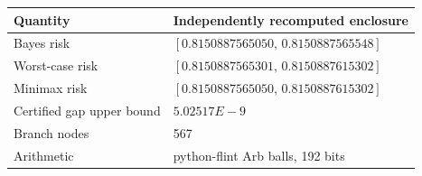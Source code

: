 \begin{tabular}{ll}
\toprule
Quantity & Independently recomputed enclosure \\
\midrule
Bayes risk & $[0.8150887565050,\,0.8150887565548]$ \\
Worst-case risk & $[0.8150887565301,\,0.8150887615302]$ \\
Minimax risk & $[0.8150887565050,\,0.8150887615302]$ \\
Certified gap upper bound & $5.02517E-9$ \\
Branch nodes & 567 \\
Arithmetic & python-flint Arb balls, 192 bits \\
\bottomrule
\end{tabular}
